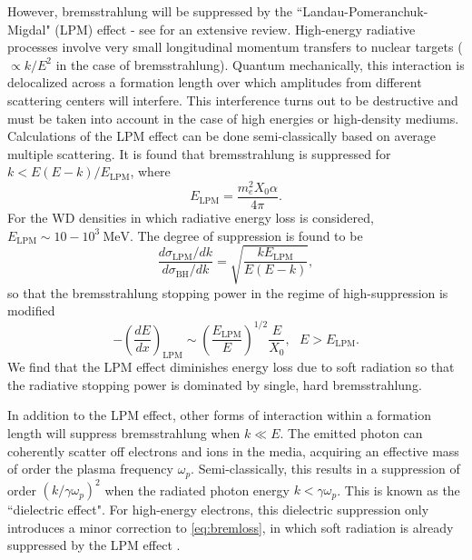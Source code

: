 \documentclass[twocolumn,showpacs,preprintnumbers,amsmath,amssymb,prd]{revtex4}
\def\r{\right)}
\def\l{\left(}
\begin{document}
\begin{appendices}
However, bremsstrahlung will be suppressed by the ``Landau-Pomeranchuk-Migdal" (LPM) effect - see \cite{Klein:1998du} for an extensive review.
High-energy radiative processes involve very small longitudinal momentum transfers to nuclear targets ($\propto k/E^2$ in the case of bremsstrahlung).
Quantum mechanically, this interaction is delocalized across a formation length over which amplitudes from different scattering centers will interfere.
This interference turns out to be destructive and must be taken into account in the case of high energies or high-density mediums.
Calculations of the LPM effect can be done semi-classically based on average multiple scattering.
It is found that bremsstrahlung is suppressed for $k < E(E-k)/E_\text{LPM}$, where
\begin{equation}
\label{eq:LPM}
E_\text{LPM} = \frac{m_e^2 X_0 \alpha}{4 \pi}.
\end{equation}
For the WD densities in which radiative energy loss is considered, $E_\text{LPM} \sim 10-10^{3} ~\text{MeV}$.
The degree of suppression is found to be
\begin{equation}
\frac{d\sigma_\text{LPM}/dk}{d\sigma_\text{BH}/dk} = \sqrt{\frac{k E_\text{LPM}}{E (E-k)}},
\end{equation}
so that the bremsstrahlung stopping power in the regime of high-suppression is modified
\begin{equation}
\label{eq:bremloss}
-\l\frac{dE}{dx}\r_\text{LPM} \sim \l\frac{E_\text{LPM}}{E} \r^{1/2} \frac{E}{X_0}, ~~~ E>E_\text{LPM}.
\end{equation}
We find that the LPM effect diminishes energy loss due to soft radiation so that the radiative stopping power is dominated by single, hard bremsstrahlung.

In addition to the LPM effect, other forms of interaction within a formation length will suppress bremsstrahlung when $k \ll E$.
The emitted photon can coherently scatter off electrons and ions in the media, acquiring an effective mass of order the plasma frequency $\omega_p$.
Semi-classically, this results in a suppression of order $(k/\gamma \omega_p)^2$ when the radiated photon energy $k < \gamma \omega_p$.
This is known as the ``dielectric effect".
For high-energy electrons, this dielectric suppression only introduces a minor correction to \eqref{eq:bremloss}, in which soft radiation is already suppressed by the LPM effect \cite{Klein:1998du}.


\end{appendices}
\end{document}
